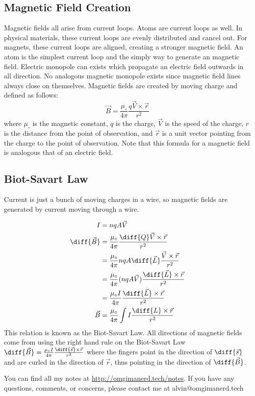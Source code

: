 \documentclass{math}
\begin{document}
\subsection*{Magnetic Field Creation}
Magnetic fields all arise from current loops. Atoms are current loops as well.
In physical materials, these current loops are evenly distributed and cancel
out. For magnets, these current loops are aligned, creating a stronger magnetic
field. An atom is the simplest current loop and the simply way to generate an
magnetic field. Electric monopole can exists which propagate an electric field
outwards in all direction. No analogous magnetic monopole exists since magnetic
field lines always close on themselves. Magnetic fields are created by moving
charge and defined as follows:
\[ \vec{B} = \frac{\mu_{\circ}}{4\pi}\frac{q\vec{V}\times\vec{r}}{r^2} \]
where \( \mu_{\circ} \) is the magnetic constant, \( q \) is the charge,
\( \vec{V} \) is the speed of the charge, \( r \) is the distance from the point
of observation, and \( \vec{r} \) is a unit vector pointing from the charge to
the point of observation. Note that this formula for a magnetic field is
analogous that of an electric field.

\subsection*{Biot-Savart Law}
Current is just a bunch of moving charges in a wire, so magnetic fields are
generated by current moving through a wire.
\begin{center}
\end{center}
\begin{align*}
  I &= nqA\vec{V} \\
  \diff{\vec{B}} &=
    \frac{\mu_{\circ}}{4\pi}\frac{\diff{Q}\vec{V}\times\vec{r}}{r^2} \\
  &= \frac{\mu_{\circ}}{4\pi}nqA\diff{\vec{L}}
    \frac{\vec{V}\times\vec{r}}{r^2} \\
  &= \frac{\mu_{\circ}}{4\pi}(nqA\vec{V})
    \frac{\diff{\vec{L}}\times\vec{r}}{r^2} \\
  &= \frac{\mu_{\circ}I}{4\pi}\frac{\diff{\vec{L}}\times\vec{r}}{r^2} \\
  \vec{B} &= \frac{\mu_{\circ}}{4\pi}\int I\frac{\diff{L}\times\vec{r}}{r^2}
\end{align*}
This relation is known as the Biot-Savart Law. All directions of magnetic fields
come from using the right hand rule on the Biot-Savart Law \( \diff{\vec{B}} =
\frac{\mu_{\circ}I}{4\pi}\frac{\diff{\vec{s}}\times\vec{r}}{r^2} \) where the
fingers point in the direction of \( \diff{\vec{s}} \) and are curled in the
direction of \( \vec{r} \), thus pointing in the direction of
\( \diff{\vec{B}} \).

\begin{center}
  You can find all my notes at \url{http://omgimanerd.tech/notes}. If you have
  any questions, comments, or concerns, please contact me at
  alvin@omgimanerd.tech
\end{center}
\end{document}
